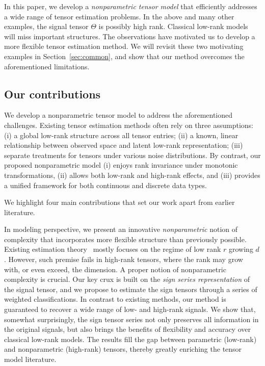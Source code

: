 \documentclass[twoside,11pt]{article}
\theoremstyle{definition}
\begin{document}
In this paper, we develop a \emph{nonparametric tensor model} that efficiently addresses a wide range of tensor estimation problems. In the above and many other examples, the signal tensor $\Theta$ is possibly high rank. Classical low-rank models will miss important structures.  The observations have motivated us to develop a more flexible tensor estimation method. We will revisit these two motivating examples in Section~\ref{sec:common}, and show that our method overcomes the aforementioned limitations. 


\subsection{Our contributions}
We develop a nonparametric tensor model to address the aforementioned challenges. Existing tensor estimation methods often rely on three assumptions: (i) a global low-rank structure across all tensor entries; (ii) a known, linear relationship between observed space and latent low-rank representation; (iii) separate treatments for tensors under various noise distributions. By contrast, our proposed nonparametric model (i) enjoys rank invariance under monotonic transformations, (ii) allows both low-rank and high-rank effects, and (iii) provides a unified framework for both continuous and discrete data types.  

We highlight four main contributions that set our work apart from earlier literature. 


In modeling perspective, we present an innovative \emph{nonparametric} notion of complexity that incorporates more flexible structure than previously possible. Existing estimation theory~\citep{anandkumar2014tensor,montanari2018spectral,cai2019nonconvex} mostly focuses on the regime of low rank $r$ growing $d$. However, such premise fails in high-rank tensors, where the rank may grow with, or even exceed, the dimension. A proper notion of nonparametric complexity is crucial. Our key crux is built on the \emph{sign series representation} of the signal tensor, and we propose to estimate the sign tensors through a series of weighted classifications. In contrast to existing methods, our method is guaranteed to recover a wide range of low- and high-rank signals.  We show that, somewhat surprisingly, the sign tensor series not only preserves all information in the original signals, but also brings the benefits of flexibility and accuracy over classical low-rank models. The results fill the gap between parametric (low-rank) and nonparametric (high-rank) tensors, thereby greatly enriching the tensor model literature. 
\end{document}
